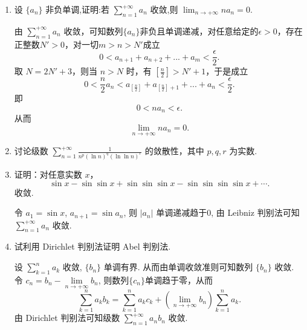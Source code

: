 \begin{enumerate}
\begin{solution}
        故 $\displaystyle \sum a_n$ 收敛当且仅当 $\displaystyle \sum 2^k a_{2^k}$ 收敛.
    \end{solution}
    \item[3.]设 \(\{a_{n}\}\) 非负单调,证明:若 \(\displaystyle \sum_{n = 1}^{+\infty}a_{n}\) 收敛,则 \(\displaystyle\lim_{n\to +\infty}n a_{n} = 0\).
    \begin{solution}
        由 $\displaystyle \sum_{n=1}^{+\infty}a_{n}$ 收敛，可知数列$\{a_{n}\}$非负且单调递减，对任意给定的$\epsilon>0$，存在正整数$N'>0$，对一切$m>n>N'$成立
        \[
        0<a_{n+1}+a_{n+2}+...+a_{m}<\frac{\epsilon}{2}.
        \]
        取 $N=2N'+3$，则当 $n>N$ 时，有 $\displaystyle[\frac{n}{2}]>N'+1$，于是成立
        \[
        0<\frac{n}{2}a_{n}<a_{[\frac{n}{2}]}+a_{[\frac{n}{2}]+1}+...+a_{n}<\frac{\epsilon}{2}.
        \]
        即
        \[
        0<na_{n}<\epsilon.
        \]
        从而
        \[
        \lim_{n\to+\infty}na_{n}=0. 
        \]
    \end{solution}
    \item[4.]讨论级数 \(\displaystyle\sum_{n = 1}^{+\infty} \frac{1}{n^p (\ln n)^q (\ln \ln n)^r}\) 的敛散性，其中 \(p, q, r\) 为实数.
    \item[5.]证明：对任意实数 \(x\)，
    \[\displaystyle \sin x - \sin \sin x + \sin \sin \sin x - \sin \sin \sin \sin x + \cdots.\]
    收敛.
    \begin{solution}
        令 $a_1 = \sin x$, $a_{n+1} = \sin a_n$, 则 $|a_n|$ 单调递减趋于0, 由 Leibniz 判别法可知 $\displaystyle \sum_{n=1}^{+\infty}a_{n}$ 收敛.
    \end{solution}
    
    \item[6.]试利用 Dirichlet 判别法证明 Abel 判别法.
    \begin{solution}
        设 $\displaystyle \sum_{k=1}^{n} a_k$ 收敛, $\{b_n\}$ 单调有界. 
        从而由单调收敛准则可知数列 $\{b_{n}\}$ 收敛.\\
        令 $\displaystyle c_n = b_n - \underset{n\to+\infty}{\lim} b_n$, 则数列$\{c_{n}\}$单调趋于零，从而 
        \[ \sum_{k=1}^{n} a_k b_k = \sum_{k=1}^{n} a_k c_k + \left(\lim_{n\to+\infty} b_n\right)\sum_{k=1}^{n} a_k. \]
        由 Dirichlet 判别法可知级数 $\displaystyle \sum_{n=1}^{+\infty}a_{n}b_{n}$ 收敛.
    \end{solution}
\end{enumerate}